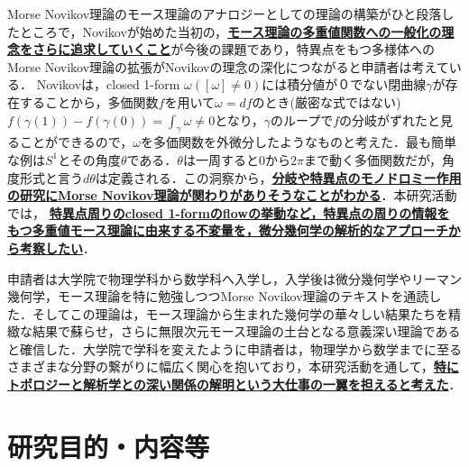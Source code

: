 \documentclass[11pt,a4j,dvipdfmx]{jarticle} 					%
\newcommand{\研究課題名}{象の卵}
\newcommand{\研究機関名}{京都大学}
\newcommand{\研究代表者氏名}{福士謙二}
\begin{document}
\noindent

Morse Novikov理論のモース理論のアナロジーとしての理論の構築がひと段落したところで，Novikovが始めた当初の，\textbf{\ul{モース理論の多重値関数への一般化の理念をさらに追求していくこと}}が今後の課題であり，特異点をもつ多様体へのMorse Novikov理論の拡張がNovikovの理念の深化につながると申請者は考えている．
Novikovは，closed 1-form $\omega([\omega]\neq0)$には積分値が０でない閉曲線$\gamma$が存在することから，多価関数$f$を用いて$\omega=df$のとき(厳密な式ではない) $f(\gamma(1))-f(\gamma(0)) = \int_{\gamma}\omega\neq0$となり，$\gamma$のループで$f$の分岐がずれたと見ることができるので，$\omega$を多価関数を外微分したようなものと考えた．最も簡単な例は$S^1$とその角度$\theta$である．$\theta$は一周すると0から$2\pi$まで動く多価関数だが，角度形式と言う$d\theta$は定義される．この洞察から，\textbf{\ul{分岐や特異点のモノドロミー作用の研究にMorse Novikov理論が関わりがありそうなことがわかる}}．本研究活動では，
\textbf{\ul{特異点周りのclosed 1-formのflowの挙動など，特異点の周りの情報をもつ多重値モース理論に由来する不変量を，微分幾何学の解析的なアプローチから考察したい}}．


\noindent

	申請者は大学院で物理学科から数学科へ入学し，入学後は微分幾何学やリーマン幾何学，モース理論を特に勉強しつつMorse Novikov理論のテキストを通読した．そしてこの理論は，モース理論から生まれた幾何学の華々しい結果たちを精緻な結果で蘇らせ，さらに無限次元モース理論の土台となる意義深い理論であると確信した．大学院で学科を変えたように申請者は，物理学から数学までに至るさまざまな分野の繋がりに幅広く関心を抱いており，本研究活動を通して，\textbf{\ul{特にトポロジーと解析学との深い関係の解明という大仕事の一翼を担えると考えた}}．








\section{研究目的・内容等}

\noindent
{}
\end{document}
